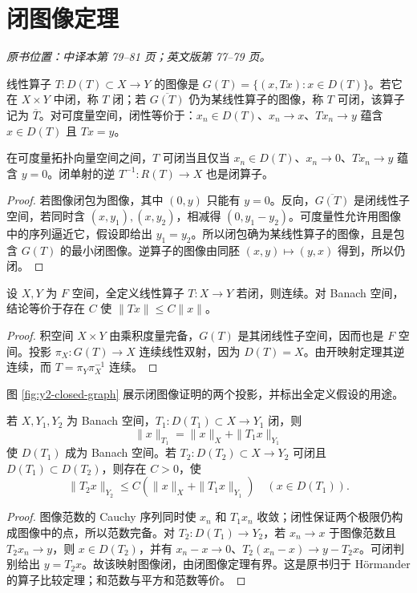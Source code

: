 \section{闭图像定理}\label{sec:yosida-02-06}
\noindent\textit{原书位置：中译本第 79--81 页；英文版第 77--79 页。}

\begin{definition}[闭算子与可闭算子]
线性算子 $T:D(T)\subset X\to Y$ 的图像是 $G(T)=\{(x,Tx):x\in D(T)\}$。若它在 $X\times Y$ 中闭，称 $T$ 闭；若 $\overline{G(T)}$ 仍为某线性算子的图像，称 $T$ 可闭，该算子记为 $\overline T$。对可度量空间，闭性等价于：$x_n\in D(T)$、$x_n\to x$、$Tx_n\to y$ 蕴含 $x\in D(T)$ 且 $Tx=y$。
\end{definition}

\begin{proposition}[可闭判别与逆算子的闭性]\label{prop:y2-closable}
在可度量拓扑向量空间之间，$T$ 可闭当且仅当 $x_n\in D(T)$、$x_n\to0$、$Tx_n\to y$ 蕴含 $y=0$。闭单射的逆 $T^{-1}:R(T)\to X$ 也是闭算子。
\end{proposition}
\begin{proof}
若图像闭包为图像，其中 $(0,y)$ 只能有 $y=0$。反向，$\overline{G(T)}$ 是闭线性子空间，若同时含 $(x,y_1),(x,y_2)$，相减得 $(0,y_1-y_2)$。可度量性允许用图像中的序列逼近它，假设即给出 $y_1=y_2$。所以闭包确为某线性算子的图像，且是包含 $G(T)$ 的最小闭图像。逆算子的图像由同胚 $(x,y)\mapsto(y,x)$ 得到，所以仍闭。
\end{proof}

\begin{theorem}\label{thm:banach-closed-graph}
设 $X,Y$ 为 $F$ 空间，全定义线性算子 $T:X\to Y$ 若闭，则连续。对 Banach 空间，结论等价于存在 $C$ 使 $\|Tx\|\le C\|x\|$。
\end{theorem}
\begin{proof}
积空间 $X\times Y$ 由乘积度量完备，$G(T)$ 是其闭线性子空间，因而也是 $F$ 空间。投影 $\pi_X:G(T)\to X$ 连续线性双射，因为 $D(T)=X$。由开映射定理其逆连续，而 $T=\pi_Y\pi_X^{-1}$ 连续。
\end{proof}

图 \ref{fig:y2-closed-graph} 展示闭图像证明的两个投影，并标出全定义假设的用途。



\begin{proposition}[图像范数与算子比较]\label{prop:y2-graph-comparison}
若 $X,Y_1,Y_2$ 为 Banach 空间，$T_1:D(T_1)\subset X\to Y_1$ 闭，则
\[
 \|x\|_{T_1}=\|x\|_X+\|T_1x\|_{Y_1}
\]
使 $D(T_1)$ 成为 Banach 空间。若 $T_2:D(T_2)\subset X\to Y_2$ 可闭且 $D(T_1)\subset D(T_2)$，则存在 $C>0$，使
\[
 \|T_2x\|_{Y_2}\le C(\|x\|_X+\|T_1x\|_{Y_1})\quad(x\in D(T_1)).
\]
\end{proposition}
\begin{proof}
图像范数的 Cauchy 序列同时使 $x_n$ 和 $T_1x_n$ 收敛；闭性保证两个极限仍构成图像中的点，所以范数完备。对 $T_2:D(T_1)\to Y_2$，若 $x_n\to x$ 于图像范数且 $T_2x_n\to y$，则 $x\in D(T_2)$，并有 $x_n-x\to0$、$T_2(x_n-x)\to y-T_2x$。可闭判别给出 $y=T_2x$。故该映射图像闭，由闭图像定理有界。这是原书归于 H\"ormander 的算子比较定理；和范数与平方和范数等价。
\end{proof}


